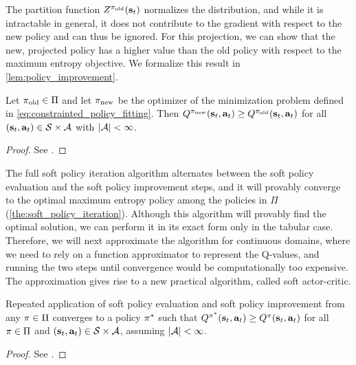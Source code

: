 The partition function $Z^{\pi_\mathrm{old}}({\mathbf{s}_t})$ normalizes the distribution, and while it is intractable in general, it does not contribute to the gradient with respect to the new policy and can thus be ignored. For this projection, we can show that the new, projected policy has a higher value than the old policy with respect to the maximum entropy objective. We formalize this result in \autoref{lem:policy_improvement}.
\begin{lemma}
\label{lem:policy_improvement}
Let $\pi_\mathrm{old} \in \Pi$ and let $\pi_\mathrm{new}$ be the optimizer of the minimization problem defined in \autoref{eq:constrainted_policy_fitting}. Then $Q^{\pi_\mathrm{new}}({\mathbf{s}_t}, {\mathbf{a}_t}) \geq Q^{\pi_\mathrm{old}}({\mathbf{s}_t}, {\mathbf{a}_t})$ for all $({\mathbf{s}_t}, {\mathbf{a}_t}) \in \mathcal{S}\times\mathcal{A}$ with $|\mathcal{A}|<\infty$.
\begin{proof}
See .
\end{proof}
\end{lemma}
The full soft policy iteration algorithm alternates between the soft policy evaluation and the soft policy improvement steps, and it will provably converge to the optimal maximum entropy policy among the policies in $\Pi$ (\autoref{the:soft_policy_iteration}). Although this algorithm will provably find the optimal solution, we can perform it in its exact form only in the tabular case. Therefore, we will next approximate the algorithm for continuous domains, where we need to rely on a function approximator to represent the Q-values, and running the two steps until convergence would be computationally too expensive. The approximation gives rise to a new practical algorithm, called soft actor-critic.
\begin{theorem}
\label{the:soft_policy_iteration}
Repeated application of soft policy evaluation and soft policy improvement from any $\pi\in\Pi$ converges to a policy $\pi^*$ such that $Q^{\pi^*}({\mathbf{s}_t}, {\mathbf{a}_t}) \geq Q^{\pi}({\mathbf{s}_t}, {\mathbf{a}_t})$ for all $\pi \in \Pi$ and $({\mathbf{s}_t}, {\mathbf{a}_t}) \in \mathcal{S}\times\mathcal{A}$, assuming $|\mathcal{A}|<\infty$.
\begin{proof}
See .
\end{proof}
\end{theorem}

